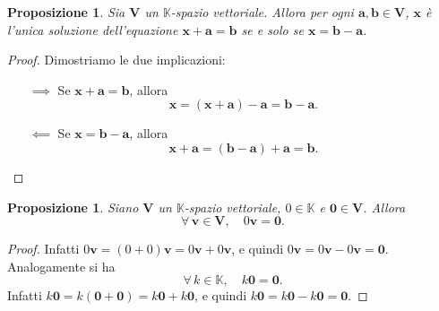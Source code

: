 \documentclass{article}
\theoremstyle{plain}
\newtheorem{prop}[thm]{Proposizione}
\theoremstyle{definition}
\theoremstyle{remark}
\begin{document}
\vspace{10pt}

\begin{bxthm}
\begin{prop}
    Sia $\mathbf{V}$ un $\mathbb{K}$-spazio vettoriale. Allora per ogni \( \mathbf{a}, \mathbf{b} \in \mathbf{V} \), \( \mathbf{x} \) è l'unica soluzione dell'equazione \( \mathbf{x} + \mathbf{a} = \mathbf{b} \) 
    se e solo se \( \mathbf{x} = \mathbf{b} - \mathbf{a} \).
\end{prop}
\end{bxthm}
\begin{proof}
    Dimostriamo le due implicazioni:
    \begin{itemize}
        \item[$\implies$] Se \( \mathbf{x} + \mathbf{a} = \mathbf{b} \), allora
        \[ \mathbf{x} = (\mathbf{x} + \mathbf{a}) - \mathbf{a} = \mathbf{b} - \mathbf{a}. \]
        \item[$\impliedby$] Se \( \mathbf{x} = \mathbf{b} - \mathbf{a} \), allora
        \[ \mathbf{x} + \mathbf{a} = (\mathbf{b} - \mathbf{a}) + \mathbf{a} = \mathbf{b}. \]
    \end{itemize}
\end{proof}

\vspace{10pt}

\begin{bxthm}
\begin{prop}
    Siano $\mathbf{V}$ un $\mathbb{K}$-spazio vettoriale, $0\in\mathbb{K}$ e $\mathbf{0} \in \mathbf{V}$. 
    Allora 
    \[ \forall\,\mathbf{v} \in \mathbf{V},\quad 0\mathbf{v} = \mathbf{0}.\]
\end{prop}
\end{bxthm}
\begin{proof}
    Infatti \( 0\mathbf{v} = (0 + 0)\mathbf{v} = 0\mathbf{v} + 0\mathbf{v} \), e quindi \( 0\mathbf{v} = 0\mathbf{v} - 0\mathbf{v} = \mathbf{0} \).
    Analogamente si ha 
    \[\forall\, k \in \mathbb{K},\quad k\mathbf{0} = \mathbf{0}.\]
    Infatti \( k\mathbf{0} = k(\mathbf{0} + \mathbf{0}) = k\mathbf{0} + k\mathbf{0} \), e quindi \( k\mathbf{0} = k\mathbf{0} - k\mathbf{0} = \mathbf{0} \).    
\end{proof}
\end{document}

